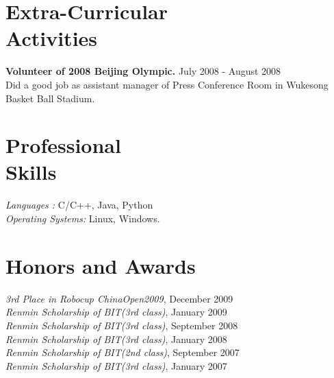 \documentclass[margin]{res}
\begin{document}
\begin{resume}
\section{Extra-Curricular \\ Activities} 
				{ \bf Volunteer of 2008 Beijing Olympic.} \hfill July 2008 - August 2008 \\  		
                 Did a good job as assistant manager of Press Conference Room in Wukesong Basket Ball Stadium.
 
 \section{Professional \\ Skills} {\sl Languages :} C/C++, Java, Python \\
                {\sl Operating Systems:} Linux, Windows.
 
\section{Honors and Awards }             
             {\it 3rd Place in Robocup ChinaOpen2009}, 	December	2009 \\             			
			 {\it Renmin Scholarship of BIT(3rd class)}, January	2009 \\            	
			 {\it Renmin Scholarship of BIT(3rd class)}, September	2008 \\            
			 {\it Renmin Scholarship of BIT(3rd class)}, January	2008 \\            
			 {\it Renmin Scholarship of BIT(2nd class)}, September	2007 \\  
			 {\it Renmin Scholarship of BIT(3rd class)}, January	2007 			 			 
\end{resume}
\end{document}
